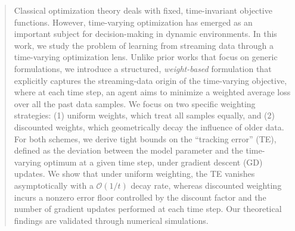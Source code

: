 \documentclass[conference]{IEEEtran}
\begin{document}
\begin{abstract}
Classical optimization theory deals with fixed, time-invariant
objective functions. However, time-varying optimization has emerged as an important subject for decision-making in dynamic environments. In this work, we study the problem of learning from streaming data through a time-varying optimization lens. Unlike prior works that focus on generic formulations, we introduce a structured, \emph{weight-based} formulation that explicitly captures the streaming-data origin of the time-varying objective, where at each time step, an agent aims to minimize a weighted average loss over all the past data samples. We focus on two specific
weighting strategies: (1) uniform weights, which treat all samples
equally, and (2) discounted weights, which geometrically decay the influence of older data. For both schemes, we derive tight bounds on the ``tracking error'' (TE), defined as the deviation between the model parameter and the time-varying optimum at a given time step, under gradient descent (GD) updates. We show that under uniform weighting, the TE vanishes asymptotically with a $\mathcal{O}(1/t)$ decay rate, whereas discounted weighting incurs a nonzero error floor controlled by the discount factor and the number of gradient updates performed at each time step. Our theoretical findings are validated through numerical simulations.
\end{abstract}






\end{document}
